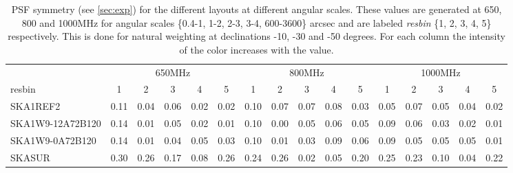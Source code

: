 \begin{table}[!htp]
{{\begin{tabular}{|lccccc||ccccc||ccccc|}
 \tabularnewline \cline{2-16} \multicolumn{1}{c}{ } & \multicolumn{5}{|c}{650MHz}  & \multicolumn{5}{c}{800MHz}  & \multicolumn{5}{c|}{1000MHz} \tabularnewline \cline{1-16} 
 resbin  &1 & 2 & 3 & 4 & 5 & 1 & 2 & 3 & 4 & 5 & 1 & 2 & 3 & 4 & 5 \tabularnewline \hline
SKA1REF2 & 0.11 \cellcolor{blue!18.00} & 0.04 \cellcolor{red!23.04} & 0.06 \cellcolor{green!24.46} & 0.02 \cellcolor{orange!18.00} & 0.02 \cellcolor{purple!19.68} & 0.10 \cellcolor{blue!18.00} & 0.07 \cellcolor{red!29.31} & 0.07 \cellcolor{green!60.00} & 0.08 \cellcolor{orange!49.50} & 0.03 \cellcolor{purple!18.00} & 0.05 \cellcolor{blue!18.00} & 0.07 \cellcolor{red!22.67} & 0.05 \cellcolor{green!30.00} & 0.04 \cellcolor{orange!46.00} & 0.02 \cellcolor{purple!20.00}\\ \hline 
SKA1W9-12A72B120 & 0.14 \cellcolor{blue!24.63} & 0.01 \cellcolor{red!18.00} & 0.05 \cellcolor{green!21.23} & 0.02 \cellcolor{orange!18.00} & 0.01 \cellcolor{purple!18.00} & 0.10 \cellcolor{blue!18.00} & 0.00 \cellcolor{red!18.00} & 0.05 \cellcolor{green!43.20} & 0.06 \cellcolor{orange!28.50} & 0.05 \cellcolor{purple!22.94} & 0.09 \cellcolor{blue!26.40} & 0.06 \cellcolor{red!20.33} & 0.03 \cellcolor{green!18.00} & 0.02 \cellcolor{orange!18.00} & 0.01 \cellcolor{purple!18.00}\\ \hline 
SKA1W9-0A72B120 & 0.14 \cellcolor{blue!24.63} & 0.01 \cellcolor{red!18.00} & 0.04 \cellcolor{green!18.00} & 0.05 \cellcolor{orange!39.00} & 0.03 \cellcolor{purple!21.36} & 0.10 \cellcolor{blue!18.00} & 0.01 \cellcolor{red!19.62} & 0.03 \cellcolor{green!26.40} & 0.09 \cellcolor{orange!60.00} & 0.06 \cellcolor{purple!25.41} & 0.09 \cellcolor{blue!26.40} & 0.05 \cellcolor{red!18.00} & 0.05 \cellcolor{green!30.00} & 0.05 \cellcolor{orange!60.00} & 0.01 \cellcolor{purple!18.00}\\ \hline 
SKASUR & 0.30 \cellcolor{blue!60.00} & 0.26 \cellcolor{red!60.00} & 0.17 \cellcolor{green!60.00} & 0.08 \cellcolor{orange!60.00} & 0.26 \cellcolor{purple!60.00} & 0.24 \cellcolor{blue!60.00} & 0.26 \cellcolor{red!60.00} & 0.02 \cellcolor{green!18.00} & 0.05 \cellcolor{orange!18.00} & 0.20 \cellcolor{purple!60.00} & 0.25 \cellcolor{blue!60.00} & 0.23 \cellcolor{red!60.00} & 0.10 \cellcolor{green!60.00} & 0.04 \cellcolor{orange!46.00} & 0.22 \cellcolor{purple!60.00}\tabularnewline \hline 
\end{tabular}}\hfil 

\caption{PSF symmetry (see \autoref{sec:exp})  for the different layouts at different angular scales. These values are generated at 650, 800 and 1000MHz for angular scales \{0.4-1, 1-2, 2-3, 3-4, 600-3600\} arcsec and are labeled {\it resbin} \{1, 2, 3, 4, 5\} respectively. This is done for natural weighting at declinations -10, -30 and -50 degrees. For each column the intensity of the color increases with the value.}\label{tab:psf_sym-band1}}
 \end{table}